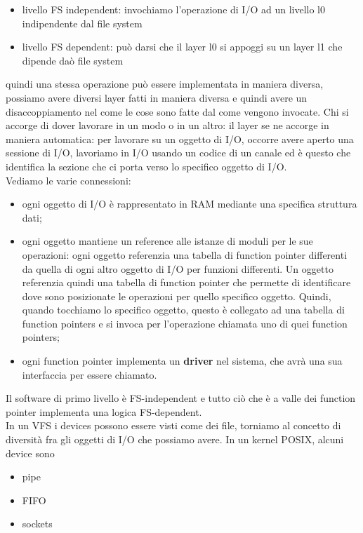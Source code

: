 \documentclass[12pt, oneside]{extbook}
\begin{document}
\begin{itemize}
\item livello FS independent: invochiamo l'operazione di I/O ad un livello l0 indipendente dal file system
\item livello FS dependent: può darsi che il layer l0 si appoggi su un layer l1 che dipende daò file system
\end{itemize}
quindi una stessa operazione può essere implementata in maniera diversa, possiamo avere diversi layer fatti in maniera diversa e quindi avere un disaccoppiamento nel come le cose sono fatte dal come vengono invocate. Chi si accorge di dover lavorare in un modo o in un altro: il layer se ne accorge in maniera automatica: per lavorare su un oggetto di I/O, occorre avere aperto una sessione di I/O, lavoriamo in I/O usando un codice di un canale ed è questo che identifica la sezione che ci porta verso lo specifico oggetto di I/O.\\Vediamo le varie connessioni:
\begin{itemize}
\item ogni oggetto di I/O è rappresentato in RAM mediante una specifica struttura dati;
\item ogni oggetto mantiene un reference alle istanze di moduli per le sue operazioni: ogni oggetto referenzia una tabella di function pointer differenti da quella di ogni altro oggetto di I/O per funzioni differenti. Un oggetto referenzia quindi una tabella di function pointer che permette di identificare dove sono posizionate le operazioni per quello specifico oggetto. Quindi, quando tocchiamo lo specifico oggetto, questo è collegato ad una tabella di function pointers e si invoca per l'operazione chiamata uno di quei function pointers;
\item ogni function pointer implementa un \textbf{driver} nel sistema, che avrà una sua interfaccia per essere chiamato.
\end{itemize}
Il software di primo livello è FS-independent e tutto ciò che è a valle dei function pointer implementa una logica FS-dependent.\\In un VFS i devices possono essere visti come dei file, torniamo al concetto di diversità fra gli oggetti di I/O che possiamo avere. In un kernel POSIX, alcuni device sono
\begin{itemize}
\item pipe
\item FIFO
\item sockets
\end{itemize} 
\end{document}
